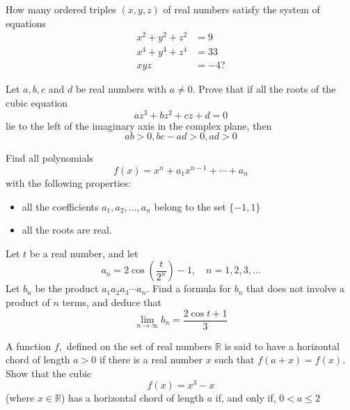 \documentclass{pset}
\begin{document}
\begin{problems}
\begin{problem}[IrMO 1992 Q2]
    How many ordered triples \((x, y, z)\) of real numbers satisfy the system of equations
    $$
    \begin{aligned}
    x^{2}+y^{2}+z^{2} &=9 \\
    x^{4}+y^{4}+z^{4} &=33 \\
    x y z &=-4 ?
    \end{aligned}
    $$
\end{problem}

\begin{problem}[IrMO 1992 Q8]
    Let \(a, b, c\) and \(d\) be real numbers with \(a \neq 0 .\) Prove that if all the roots of the cubic equation
    $$
    a z^{3}+b z^{2}+c z+d=0
    $$
    lie to the left of the imaginary axis in the complex plane, then
    $$
    a b>0, b c-a d>0, a d>0
    $$
\end{problem}

\begin{problem}[IrMO 1991 Q5]
    Find all polynomials
    $$
    f(x)=x^{n}+a_{1} x^{n-1}+\cdots+a_{n}
    $$
    with the following properties:
    \begin{itemize}
        \item all the coefficients \(a_{1}, a_{2}, \ldots, a_{n}\) belong to the set \(\{-1,1\}\)
        \item all the roots are real.
    \end{itemize}
\end{problem}

\begin{problem}[IrMO 1990 Q8]
    Let \(t\) be a real number, and let
    $$
    a_{n}=2 \cos \left(\frac{t}{2^{n}}\right)-1, \quad n=1,2,3, \ldots
    $$
    Let \(b_{n}\) be the product \(a_{1} a_{2} a_{3} \cdots a_{n} .\) Find a formula for \(b_{n}\) that does not involve a product of \(n\) terms, and deduce that
    $$
    \lim _{n \rightarrow \infty} b_{n}=\frac{2 \cos t+1}{3}
    $$
\end{problem}

\begin{problem}[IrMO 1988 Q7]
    A function \(f,\) defined on the set of real numbers \(\mathbb{R}\) is said to have a horizontal chord of length \(a>0\) if there is a real number \(x\) such that \(f(a+x)=f(x) .\) Show that the cubic
    $$f(x)=x^{3}-x$$
    (where \(x \in \mathbb{R}\))
    has a horizontal chord of length \(a\) if, and only if, \(0<a \leq 2\)
\end{problem}


\end{problems}
\end{document}
